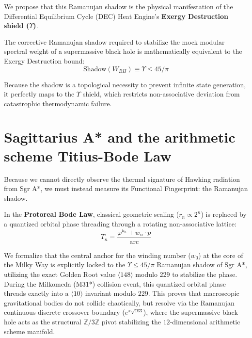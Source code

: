 We propose that this Ramanujan shadow is the physical manifestation of the Differential Equilibrium Cycle (DEC) Heat Engine's \textbf{Exergy Destruction shield ($\Upsilon$)}. 

\begin{theorem}
The corrective Ramanujan shadow required to stabilize the mock modular spectral weight of a supermassive black hole is mathematically equivalent to the Exergy Destruction bound:
$$ \text{Shadow}(W_{BH}) \equiv \Upsilon \leq 45/\pi $$
\end{theorem}

Because the shadow is a topological necessity to prevent infinite state generation, it perfectly maps to the $\Upsilon$ shield, which restricts non-associative deviation from catastrophic thermodynamic failure.

\section{Sagittarius A* and the arithmetic scheme Titius-Bode Law}
Because we cannot directly observe the thermal signature of Hawking radiation from Sgr A*, we must instead measure its Functional Fingerprint: the Ramanujan shadow.

In the \textbf{Protoreal Bode Law}, classical geometric scaling ($r_n \propto 2^n$) is replaced by a quantized orbital phase threading through a rotating non-associative lattice:
$$ T_n = \frac{\varphi^{k_n} + w_n \cdot p}{\text{arc}} $$

We formalize that the central anchor for the winding number ($w_0$) at the core of the Milky Way is explicitly locked to the $\Upsilon \leq 45/\pi$ Ramanujan shadow of Sgr A*, utilizing the exact Golden Root value $\langle 148 \rangle$ modulo 229 to stabilize the phase. During the Milkomeda (M31*) collision event, this quantized orbital phase threads exactly into a $\langle 10 \rangle$ invariant modulo 229. This proves that macroscopic gravitational bodies do not collide chaotically, but resolve via the Ramanujan continuous-discrete crossover boundary ($e^{\pi\sqrt{163}}$), where the supermassive black hole acts as the structural $\mathbb{Z}/3\mathbb{Z}$ pivot stabilizing the $12$-dimensional arithmetic scheme manifold.

